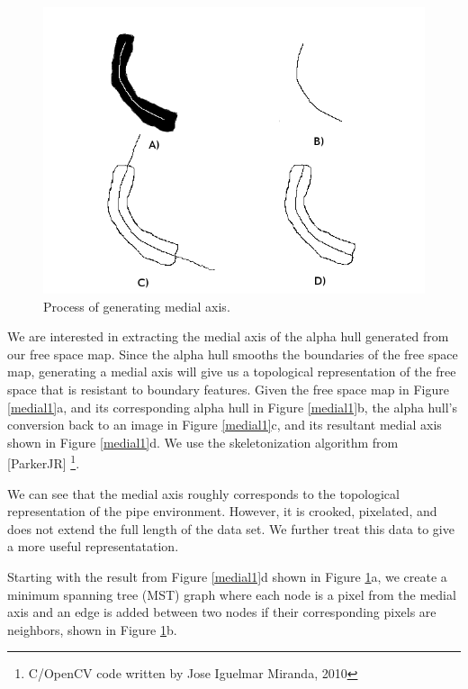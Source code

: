 \begin{figure}
  \begin{center}
    \includegraphics[scale=0.9]{4_medial_process2.png}
  \end{center}
  \caption{Process of generating medial axis.}
	\label{medial2}
\end{figure}

We are interested in extracting the medial axis of the alpha hull generated from our free space map.  Since the alpha hull smooths the boundaries of the free space map, generating a medial axis will give us a topological representation of the free space that is resistant to boundary features.  Given the free space map in Figure \ref{medial1}a, and its corresponding alpha hull in Figure \ref{medial1}b, the alpha hull's conversion back to an image in Figure \ref{medial1}c, and its resultant medial axis shown in Figure \ref{medial1}d.  We use the skeletonization algorithm from [ParkerJR] \footnote{C/OpenCV code written by Jose Iguelmar Miranda, 2010}.

We can see that the medial axis roughly corresponds to the topological representation of the pipe environment.  However, it is crooked, pixelated, and does not extend the full length of the data set.  We further treat this data to give a more useful representatation.

Starting with the result from Figure \ref{medial1}d shown in Figure \ref{medial2}a, we create a minimum spanning tree (MST) graph where each node is a pixel from the medial axis and an edge is added between two nodes if their corresponding pixels are neighbors, shown in Figure \ref{medial2}b.

